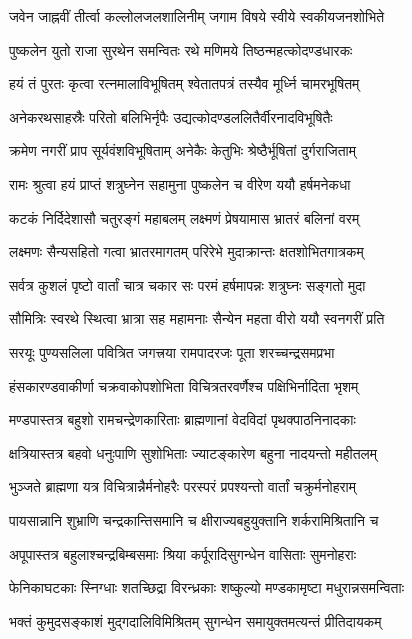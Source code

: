 \twolineshloka
{जवेन जाह्नवीं तीर्त्वा कल्लोलजलशालिनीम्}
{जगाम विषये स्वीये स्वकीयजनशोभिते}%

\twolineshloka
{पुष्कलेन युतो राजा सुरथेन समन्वितः}
{रथे मणिमये तिष्ठन्महत्कोदण्डधारकः}%

\twolineshloka
{हयं तं पुरतः कृत्वा रत्नमालाविभूषितम्}
{श्वेतातपत्रं तस्यैव मूर्ध्नि चामरभूषितम्}%

\twolineshloka
{अनेकरथसाहस्रैः परितो बलिभिर्नृपैः}
{उद्यत्कोदण्डललितैर्वीरनादविभूषितैः}%

\twolineshloka
{क्रमेण नगरीं प्राप सूर्यवंशविभूषिताम्}
{अनेकैः केतुभिः श्रेष्ठैर्भूषितां दुर्गराजिताम्}%

\twolineshloka
{रामः श्रुत्वा हयं प्राप्तं शत्रुघ्नेन सहामुना}
{पुष्कलेन च वीरेण ययौ हर्षमनेकधा}%

\twolineshloka
{कटकं निर्दिदेशासौ चतुरङ्गं महाबलम्}
{लक्ष्मणं प्रेषयामास भ्रातरं बलिनां वरम्}%

\twolineshloka
{लक्ष्मणः सैन्यसहितो गत्वा भ्रातरमागतम्}
{परिरेभे मुदाक्रान्तः क्षतशोभितगात्रकम्}%

\twolineshloka
{सर्वत्र कुशलं पृष्टो वार्तां चात्र चकार सः}
{परमं हर्षमापन्नः शत्रुघ्नः सङ्गतो मुदा}%

\twolineshloka
{सौमित्रिः स्वरथे स्थित्वा भ्रात्रा सह महामनाः}
{सैन्येन महता वीरो ययौ स्वनगरीं प्रति}%

\twolineshloka
{सरयूः पुण्यसलिला पवित्रित जगत्त्रया}
{रामपादरजः पूता शरच्चन्द्रसमप्रभा}%

\twolineshloka
{हंसकारण्डवाकीर्णा चक्रवाकोपशोभिता}
{विचित्रतरवर्णैश्च पक्षिभिर्नादिता भृशम्}%

\twolineshloka
{मण्डपास्तत्र बहुशो रामचन्द्रेणकारिताः}
{ब्राह्मणानां वेदविदां पृथक्पाठनिनादकाः}%

\twolineshloka
{क्षत्रियास्तत्र बहवो धनुःपाणि सुशोभिताः}
{ज्याटङ्कारेण बहुना नादयन्तो महीतलम्}%

\twolineshloka
{भुञ्जते ब्राह्मणा यत्र विचित्रान्नैर्मनोहरैः}
{परस्परं प्रपश्यन्तो वार्तां चक्रुर्मनोहराम्}%

\twolineshloka
{पायसान्नानि शुभ्राणि चन्द्रकान्तिसमानि च}
{क्षीराज्यबहुयुक्तानि शर्करामिश्रितानि च}%

\twolineshloka
{अपूपास्तत्र बहुलाश्चन्द्रबिम्बसमाः श्रिया}
{कर्पूरादिसुगन्धेन वासिताः सुमनोहराः}%

\twolineshloka
{फेनिकाघटकाः स्निग्धाः शतच्छिद्रा विरन्ध्रकाः}
{शष्कुल्यो मण्डकामृष्टा मधुरान्नसमन्विताः}%

\twolineshloka
{भक्तं कुमुदसङ्काशं मुद्गदालिविमिश्रितम्}
{सुगन्धेन समायुक्तमत्यन्तं प्रीतिदायकम्}%

